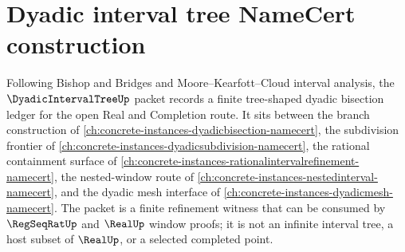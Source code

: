 \chapter{Dyadic interval tree NameCert construction}
\label{ch:concrete-instances-dyadicintervaltree-namecert}

Following Bishop and Bridges and Moore--Kearfott--Cloud interval analysis, the $\DyadicIntervalTreeUp$ packet records a finite tree-shaped dyadic bisection ledger for the open Real and Completion route. It sits between the branch construction of \autoref{ch:concrete-instances-dyadicbisection-namecert}, the subdivision frontier of \autoref{ch:concrete-instances-dyadicsubdivision-namecert}, the rational containment surface of \autoref{ch:concrete-instances-rationalintervalrefinement-namecert}, the nested-window route of \autoref{ch:concrete-instances-nestedinterval-namecert}, and the dyadic mesh interface of \autoref{ch:concrete-instances-dyadicmesh-namecert}. The packet is a finite refinement witness that can be consumed by $\RegSeqRatUp$ and $\RealUp$ window proofs; it is not an infinite interval tree, a host subset of $\RealUp$, or a selected completed point.

